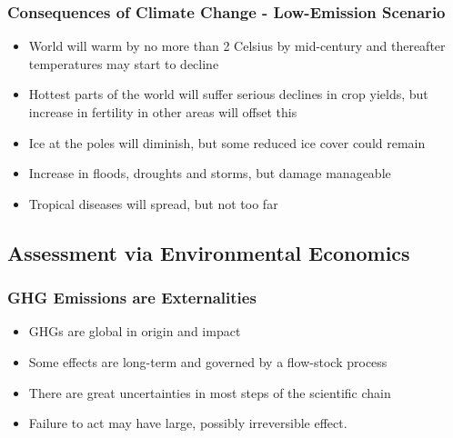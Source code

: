 
\begin{frame}
 \frametitle{Consequences of Climate Change - Low-Emission Scenario }
\begin{itemize}
\item<1-> World will warm by no more than 2 Celsius by mid-century and thereafter temperatures may start to decline
\item<2-> Hottest parts of the world will suffer serious declines in crop yields, but increase in fertility in other areas will offset this
\item<3-> Ice at the poles will diminish, but some reduced ice cover could remain
\item<4-> Increase in floods, droughts and storms, but damage manageable
\item<5-> Tropical diseases will spread, but not too far
\end{itemize}
\end{frame} %

\subsection{Assessment via Environmental Economics}

\begin{frame}
\frametitle{GHG Emissions are Externalities}
\begin{itemize}
\item<1-> GHGs are global in origin and impact
\item<2-> Some effects are long-term and governed by a flow-stock process
\item<3-> There are great uncertainties in most steps of the scientific chain
\item<4-> Failure to act may have large, possibly irreversible effect.
\end{itemize}
\end{frame}

